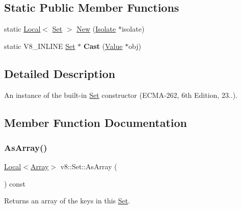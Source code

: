 \subsection*{Static Public Member Functions}
\begin{DoxyCompactItemize}
\item 
static \mbox{\hyperlink{classv8_1_1Local}{Local}}$<$ \mbox{\hyperlink{classv8_1_1Set}{Set}} $>$ \mbox{\hyperlink{classv8_1_1Set_a036e773566a36997a79e78ef0a4103a1}{New}} (\mbox{\hyperlink{classv8_1_1Isolate}{Isolate}} $\ast$isolate)
\item 
\mbox{\label{classv8_1_1Set_a1739da4ee6bf39c381b83023f653e995}} 
static V8\+\_\+\+I\+N\+L\+I\+NE \mbox{\hyperlink{classv8_1_1Set}{Set}} $\ast$ {\bfseries Cast} (\mbox{\hyperlink{classv8_1_1Value}{Value}} $\ast$obj)
\end{DoxyCompactItemize}


\subsection{Detailed Description}
An instance of the built-\/in \mbox{\hyperlink{classv8_1_1Set}{Set}} constructor (E\+C\+M\+A-\/262, 6th Edition, 23..). 

\subsection{Member Function Documentation}
\mbox{\label{classv8_1_1Set_aa4e8576e0a657bcd61364f3bc26e2b56}} 
\subsubsection{\texorpdfstring{As\+Array()}{AsArray()}}
{\footnotesize\ttfamily \mbox{\hyperlink{classv8_1_1Local}{Local}}$<$\mbox{\hyperlink{classv8_1_1Array}{Array}}$>$ v8\+::\+Set\+::\+As\+Array (\begin{DoxyParamCaption}{ }\end{DoxyParamCaption}) const}

Returns an array of the keys in this \mbox{\hyperlink{classv8_1_1Set}{Set}}. \mbox{\label{classv8_1_1Set_a036e773566a36997a79e78ef0a4103a1}} 
